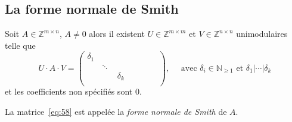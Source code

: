 \subsection*{La forme normale de Smith}
\label{sec:la-forme-normale-smith}

   \begin{theorem}
    \label{thr:28}
    Soit $A \in \mathbb{Z}^{m\times n}$, $A≠0$ alors il existent $ U \in \mathbb{Z}^{m\times m}$ et $V \in
    \mathbb{Z}^{n\times n}$ unimodulaires telle que
    \begin{equation}
      \label{eq:58}
    U⋅A⋅V = \begin{pmatrix}
      \delta _{ 1 } & \quad & \quad & \quad & \quad \\ \quad & \ddots
      & \quad & \quad & \quad \\ \quad& \quad& \delta _{ k } & \quad &
      \quad \\ \quad & \quad & \quad & \quad &\quad
    \end{pmatrix}, \quad \text{ avec } \delta_i \in
    \mathbb{N}_{\ge1} \text{ et } \delta_1| \cdots |\delta_k
  \end{equation}
  et les coefficients
    non spécifiés sont $0$. 
  \end{theorem}
  \noindent 
  La matrice~\eqref{eq:58} est appelée
  la \emph{forme normale de Smith} de $A$. 
